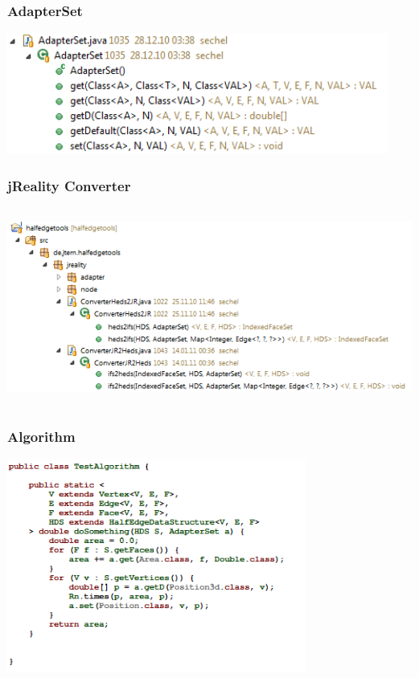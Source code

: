 \documentclass[12pt]{beamer}
\begin{document}
\begin{frame}
\frametitle{AdapterSet}
\begin{center}
\includegraphics[height=4cm]{adapterset.png}\\	
\end{center}
\end{frame}

\begin{frame}
\frametitle{jReality Converter}
\includegraphics[height=6.5cm]{converter.png}\\	
\end{frame}

\begin{frame}
\frametitle{Algorithm}
\includegraphics[height=7cm]{algorithm.png}\\	
\end{frame}
\end{document}
